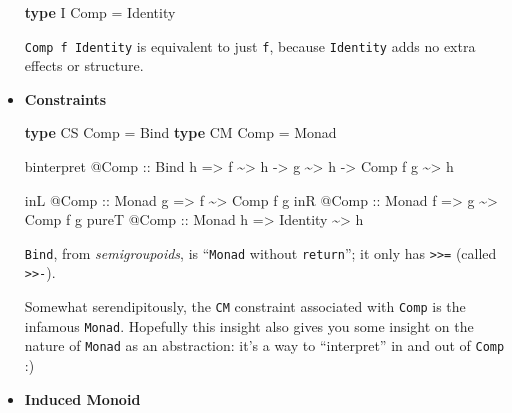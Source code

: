 \documentclass[]{article}
\newenvironment{Shaded}{}{}
\newcommand{\DataTypeTok}[1]{\textcolor[rgb]{0.56,0.13,0.00}{#1}}
\newcommand{\KeywordTok}[1]{\textcolor[rgb]{0.00,0.44,0.13}{\textbf{#1}}}
\newcommand{\NormalTok}[1]{#1}
\newcommand{\OperatorTok}[1]{\textcolor[rgb]{0.40,0.40,0.40}{#1}}
\newcommand{\OtherTok}[1]{\textcolor[rgb]{0.00,0.44,0.13}{#1}}
\begin{document}
\begin{itemize}
\begin{Shaded}
\begin{Highlighting}[]
\KeywordTok{type} \DataTypeTok{I} \DataTypeTok{Comp} \OtherTok{=} \DataTypeTok{Identity}
\end{Highlighting}
\end{Shaded}

  \texttt{Comp\ f\ Identity} is equivalent to just \texttt{f}, because
  \texttt{Identity} adds no extra effects or structure.
\item
  \textbf{Constraints}

\begin{Shaded}
\begin{Highlighting}[]
\KeywordTok{type} \DataTypeTok{CS} \DataTypeTok{Comp} \OtherTok{=} \DataTypeTok{Bind}
\KeywordTok{type} \DataTypeTok{CM} \DataTypeTok{Comp} \OtherTok{=} \DataTypeTok{Monad}

\NormalTok{binterpret }\OperatorTok{@}\DataTypeTok{Comp}
\OtherTok{    ::} \DataTypeTok{Bind}\NormalTok{ h}
    \OtherTok{=>}\NormalTok{ f }\OperatorTok{\textasciitilde{}>}\NormalTok{ h}
    \OtherTok{{-}>}\NormalTok{ g }\OperatorTok{\textasciitilde{}>}\NormalTok{ h}
    \OtherTok{{-}>} \DataTypeTok{Comp}\NormalTok{ f g }\OperatorTok{\textasciitilde{}>}\NormalTok{ h}

\NormalTok{inL   }\OperatorTok{@}\DataTypeTok{Comp}\OtherTok{ ::} \DataTypeTok{Monad}\NormalTok{ g }\OtherTok{=>}\NormalTok{ f        }\OperatorTok{\textasciitilde{}>} \DataTypeTok{Comp}\NormalTok{ f g}
\NormalTok{inR   }\OperatorTok{@}\DataTypeTok{Comp}\OtherTok{ ::} \DataTypeTok{Monad}\NormalTok{ f }\OtherTok{=>}\NormalTok{ g        }\OperatorTok{\textasciitilde{}>} \DataTypeTok{Comp}\NormalTok{ f g}
\NormalTok{pureT }\OperatorTok{@}\DataTypeTok{Comp}\OtherTok{ ::} \DataTypeTok{Monad}\NormalTok{ h }\OtherTok{=>} \DataTypeTok{Identity} \OperatorTok{\textasciitilde{}>}\NormalTok{ h}
\end{Highlighting}
\end{Shaded}

  \texttt{Bind}, from \emph{semigroupoids}, is ``\texttt{Monad} without
  \texttt{return}''; it only has \texttt{\textgreater{}\textgreater{}=} (called
  \texttt{\textgreater{}\textgreater{}-}).

  Somewhat serendipitously, the \texttt{CM} constraint associated with
  \texttt{Comp} is the infamous \texttt{Monad}. Hopefully this insight also
  gives you some insight on the nature of \texttt{Monad} as an abstraction: it's
  a way to ``interpret'' in and out of \texttt{Comp} :)
\item
  \textbf{Induced Monoid}


\end{itemize}
\end{document}
